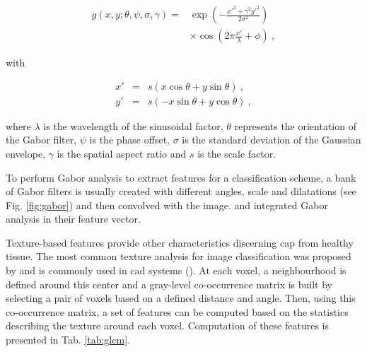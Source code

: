 \begin{enumerate}[leftmargin=*]
\begin{equation}
\begin{aligned}
	g(x,y;\theta,\psi,\sigma,\gamma) = & \exp \left( - \frac{x'^{2}+ \gamma^{2}y'^{2}}{2 \sigma^{2}} \right) \\
	& \times \cos \left( 2 \pi \frac{x'}{\lambda} + \phi \right) \ ,
\end{aligned}
\end{equation}

\noindent with 

\begin{eqnarray}
	x' & = & s\left( x \cos \theta + y \sin \theta \right) \ , \nonumber \\
	y' & = & s \left( - x \sin \theta + y \cos \theta \right) \ , \nonumber
\end{eqnarray}

\noindent where $\lambda$ is the wavelength of the sinusoidal factor, $\theta$ represents the orientation of the Gabor filter, $\psi$ is the phase offset, $\sigma$ is the standard deviation of the Gaussian envelope, $\gamma$ is the spatial aspect ratio and $s$ is the scale factor.

To perform Gabor analysis to extract features for a classification scheme, a bank of Gabor filters is usually created with different angles, scale and dilatations (see Fig. \ref{fig:gabor}) and then convolved with the image. \cite{Viswanath2008a,Viswanath2012} and \cite{Tiwari2012} integrated Gabor analysis in their feature vector.

Texture-based features provide other characteristics discerning \ac{cap} from healthy tissue. The most common texture analysis for image classification was proposed by \cite{Haralick1973} and is commonly used in \ac{cad} systems (\cite{Antic2013,Niaf2011,Niaf2012,Tiwari2009a,Tiwari2010,Tiwari2013,Viswanath2008,Viswanath2008a,Viswanath2011,Viswanath2012}). At each voxel, a neighbourhood is defined around this center and a gray-level co-occurrence matrix is built by selecting a pair of voxels based on a defined distance and angle. Then, using this co-occurrence matrix, a set of features can be computed based on the statistics describing the texture around each voxel. Computation of these features is presented in Tab. \ref{tab:glcm}.


\end{enumerate}
